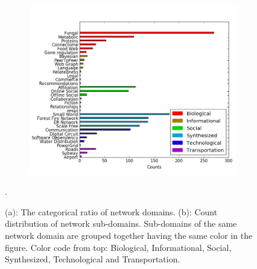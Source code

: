 \documentclass{article}
\begin{document}
\begin{figure}[H]
\begin{subfigure}{0.45\textwidth}
\includegraphics[width=\linewidth]{figs/subdomain_dist.png}
\caption{}\label{sub_dist}
\end{subfigure}\hspace*{\fill}

\caption{(a): The categorical ratio of network domains. (b):  Count distribution of network sub-domains. Sub-domains of the same network domain are grouped together having the same color in the figure. Color code from top: Biological, Informational, Social, Synthesized, Technological and Transportation.} \label{category_dist}.
\end{figure}
\end{document}
